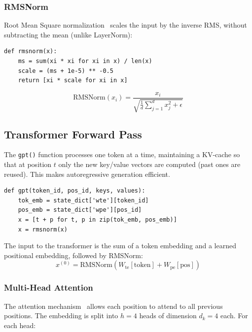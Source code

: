 \documentclass[11pt,a4paper]{article}
\begin{document}
\subsubsection{RMSNorm}
Root Mean Square normalization~\cite{zhang2019root} scales the input by the inverse RMS, without subtracting the mean (unlike LayerNorm):
\begin{lstlisting}[firstnumber=158]
def rmsnorm(x):
    ms = sum(xi * xi for xi in x) / len(x)
    scale = (ms + 1e-5) ** -0.5
    return [xi * scale for xi in x]
\end{lstlisting}
\[
\text{RMSNorm}(x_i) = \frac{x_i}{\sqrt{\frac{1}{d}\sum_{j=1}^d x_j^2 + \epsilon}}
\]

\subsection{Transformer Forward Pass}

The \texttt{gpt()} function processes one token at a time, maintaining a KV-cache so that at position $t$ only the new key/value vectors are computed (past ones are reused). This makes autoregressive generation efficient.

\begin{lstlisting}[firstnumber=163]
def gpt(token_id, pos_id, keys, values):
    tok_emb = state_dict['wte'][token_id]
    pos_emb = state_dict['wpe'][pos_id]
    x = [t + p for t, p in zip(tok_emb, pos_emb)]
    x = rmsnorm(x)
\end{lstlisting}

The input to the transformer is the sum of a token embedding and a learned positional embedding, followed by RMSNorm:
\[
x^{(0)} = \text{RMSNorm}(W_{\text{te}}[\text{token}] + W_{\text{pe}}[\text{pos}])
\]

\subsubsection{Multi-Head Attention}

The attention mechanism~\cite{vaswani2017attention} allows each position to attend to all previous positions. The embedding is split into $h=4$ heads of dimension $d_k=4$ each. For each head:
\end{document}
